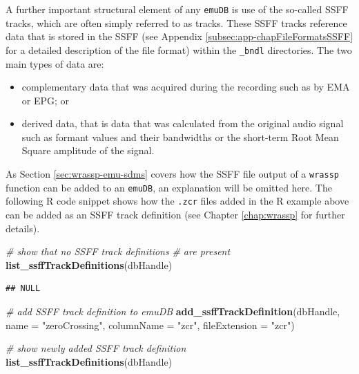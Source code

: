 \documentclass[]{book}
\newenvironment{Shaded}{\begin{snugshade}}{\end{snugshade}}
\newcommand{\CommentTok}[1]{\textcolor[rgb]{0.56,0.35,0.01}{\textit{#1}}}
\newcommand{\DataTypeTok}[1]{\textcolor[rgb]{0.13,0.29,0.53}{#1}}
\newcommand{\KeywordTok}[1]{\textcolor[rgb]{0.13,0.29,0.53}{\textbf{#1}}}
\newcommand{\NormalTok}[1]{#1}
\newcommand{\StringTok}[1]{\textcolor[rgb]{0.31,0.60,0.02}{#1}}
\providecommand{\tightlist}{%
  \setlength{\itemsep}{0pt}\setlength{\parskip}{0pt}}
\theoremstyle{definition}
\theoremstyle{definition}
\theoremstyle{definition}
\theoremstyle{remark}
\begin{document}
A further important structural element of any \texttt{emuDB} is use of
the so-called SSFF tracks, which are often simply referred to as tracks.
These SSFF tracks reference data that is stored in the SSFF (see
Appendix \ref{subsec:app-chapFileFormatsSSFF} for a detailed description
of the file format) within the \texttt{\_bndl} directories. The two main
types of data are:

\begin{itemize}
\tightlist
\item
  complementary data that was acquired during the recording such as by
  EMA or EPG; or
\item
  derived data, that is data that was calculated from the original audio
  signal such as formant values and their bandwidths or the short-term
  Root Mean Square amplitude of the signal.
\end{itemize}

As Section \ref{sec:wrassp-emu-sdms} covers how the SSFF file output of
a \texttt{wrassp} function can be added to an \texttt{emuDB}, an
explanation will be omitted here. The following R code snippet shows how
the \texttt{.zcr} files added in the R example above can be added as an
SSFF track definition (see Chapter \ref{chap:wrassp} for further
details).

\begin{Shaded}
\begin{Highlighting}[]
\CommentTok{# show that no SSFF track definitions}
\CommentTok{# are present}
\KeywordTok{list_ssffTrackDefinitions}\NormalTok{(dbHandle)}
\end{Highlighting}
\end{Shaded}

\begin{verbatim}
## NULL
\end{verbatim}

\begin{Shaded}
\begin{Highlighting}[]
\CommentTok{# add SSFF track definition to emuDB}
\KeywordTok{add_ssffTrackDefinition}\NormalTok{(dbHandle,}
                        \DataTypeTok{name =} \StringTok{"zeroCrossing"}\NormalTok{,}
                        \DataTypeTok{columnName =} \StringTok{"zcr"}\NormalTok{,}
                        \DataTypeTok{fileExtension =} \StringTok{"zcr"}\NormalTok{)}

\CommentTok{# show newly added SSFF track definition}
\KeywordTok{list_ssffTrackDefinitions}\NormalTok{(dbHandle)}
\end{Highlighting}
\end{Shaded}
\end{document}
